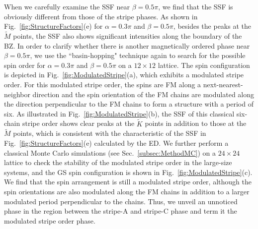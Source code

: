 \documentclass[aps,prb,reprint,amsfonts,amsmath,amssymb,showpacs,groupedaddress,superscriptaddress]{revtex4-1}
\begin{document}

When we carefully examine the SSF near $\beta=0.5\pi$, we find that the SSF is obviously different from those of the stripe phases. As shown in Fig.~\ref{fig:StructureFactors}(e) for $\alpha=0.3\pi$ and $\beta=0.5\pi$, besides the peaks at the $\tilde{M}$ points, the SSF also shows significant intensities along the boundary of the BZ. In order to clarify whether there is another magnetically ordered phase near $\beta=0.5\pi$, we use the ``basin-hopping" technique again to search for the possible spin order for $\alpha=0.3\pi$ and $\beta=0.5\pi$ on a $12 \times 12$ lattice. The spin configuration is depicted in Fig.~\ref{fig:ModulatedStripe}(a), which exhibits a modulated stripe order. For this modulated stripe order, the spins are FM along a next-nearest-neighbor direction and the spin orientation of the FM chains are modulated along the direction perpendicular to the FM chains to form a structure with a period of six. As illustrated in Fig.~\ref{fig:ModulatedStripe}(b), the SSF of this classical six-chain stripe order shows clear peaks at the $\tilde{K}$ points in addition to those at the $\tilde{M}$ points, which is consistent with the characteristic of the SSF in Fig.~\ref{fig:StructureFactors}(e) calculated by the ED. We further perform a classical Monte Carlo simulations (see Sec.~\ref{subsec:MethodMC}) on a $24 \times24$ lattice to check the stability of the modulated stripe order in the large-size systems, and the GS spin configuration is shown in Fig.~\ref{fig:ModulatedStripe}(c). We find that the spin arrangement is still a modulated stripe order, although the spin orientations are also modulated along the FM chains in addition to a larger modulated period perpendicular to the chains. Thus, we unveil an unnoticed phase in the region between the stripe-A and stripe-C phase and term it the modulated stripe order phase.
\end{document}
